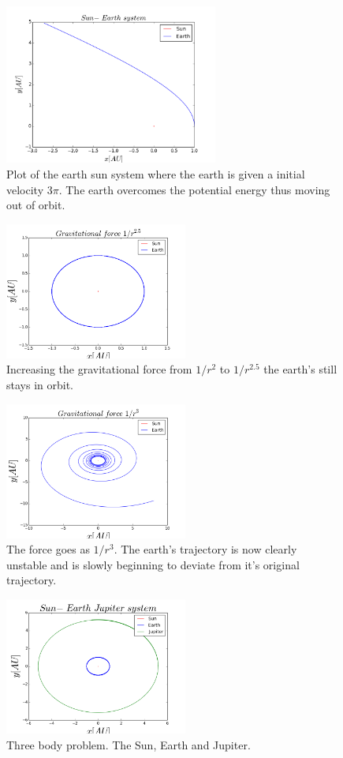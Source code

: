 \documentclass[twocolumn]{article}
\begin{document}
\begin{figure}[H]
\centering
\includegraphics[width=7cm]{escvel_earth.png}
\caption{Plot of the earth sun system where the earth is given a initial velocity $3\pi$. The earth overcomes the potential energy thus moving out of orbit.}
\end{figure}
\begin{figure}[H]
\centering
\includegraphics[width=6cm]{Gravational_force_2_5.png}
\caption{Increasing the gravitational force from $1/r^2$ to $1/r^{2.5}$ the earth's still stays in orbit.}
\end{figure}
\begin{figure}[H]
\centering
\includegraphics[width=6cm]{Gravtational_force_increase.png}
\caption{The force goes as $1/r^3$. The earth's trajectory is now clearly unstable and is slowly beginning to deviate from it's original trajectory.}
\end{figure}
\begin{figure}[H]
\centering
\includegraphics[width=6cm]{sun_earth_jupiter.png}
\caption{Three body problem. The Sun, Earth and Jupiter.}
\end{figure}
\end{document}
